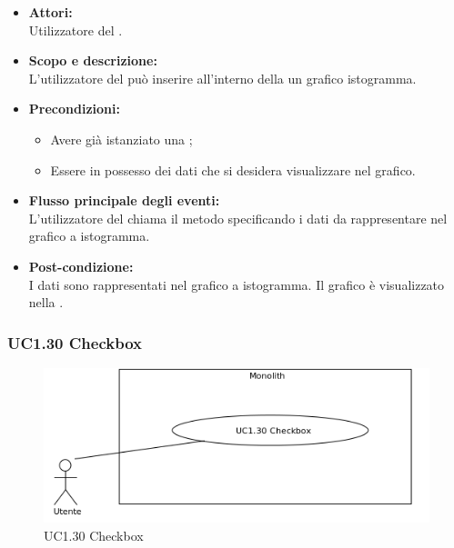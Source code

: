 \begin{itemize}
	\item \textbf{Attori:}
	\\Utilizzatore del .
	\item \textbf{Scopo e descrizione:} 
	\\L'utilizzatore del  può inserire all'interno della  un grafico istogramma.
	\item \textbf{Precondizioni:}
	\begin{itemize}
		\item Avere già istanziato una ;
		\item Essere in possesso dei dati che si desidera visualizzare nel grafico.
	\end{itemize}
	\item \textbf{Flusso principale degli eventi:}
	\\L'utilizzatore del  chiama il metodo specificando i dati da rappresentare nel grafico a istogramma.
	\item \textbf{Post-condizione:}
	\\I dati sono rappresentati nel grafico a istogramma. Il grafico è visualizzato nella .
\end{itemize}

\subsubsection{UC1.30 Checkbox} \label{UC1.30}

\begin{figure}[H]
	\centering
	\includegraphics[width=15cm]{../../documenti/AnalisiDeiRequisiti/Diagrammi_img/uc1_30.png}
	\caption{UC1.30 Checkbox}
\end{figure}

